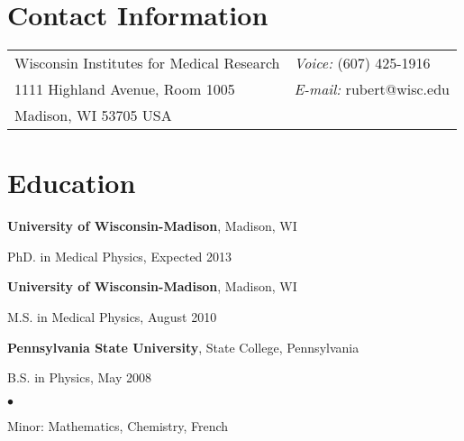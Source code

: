\documentclass[margin,line]{res}
\newenvironment{list1}{
  \begin{list}{\ding{113}}{%
      \setlength{\itemsep}{0in}
      \setlength{\parsep}{0in} \setlength{\parskip}{0in}
      \setlength{\topsep}{0in} \setlength{\partopsep}{0in}
      \setlength{\leftmargin}{0.17in}}}{\end{list}}
\newenvironment{list2}{
  \begin{list}{$\bullet$}{%
      \setlength{\itemsep}{0in}
      \setlength{\parsep}{0in} \setlength{\parskip}{0in}
      \setlength{\topsep}{0in} \setlength{\partopsep}{0in}
      \setlength{\leftmargin}{0.2in}}}{\end{list}}
\begin{document}

\begin{resume}
\section{\sc Contact Information}
\vspace{.05in}
\begin{tabular}{@{}p{3in}p{4in}}
Wisconsin Institutes for Medical Research & {\it Voice:} (607) 425-1916 \\
1111 Highland Avenue, Room 1005 & {\it E-mail:} rubert@wisc.edu \\
Madison, WI 53705 USA \\
\end{tabular}

\section{\sc Education}
{\bf University of Wisconsin-Madison}, Madison, WI \\
\vspace*{-.1in}
\begin{list1}
\item[] PhD. in Medical Physics, Expected 2013
\vspace*{.05in}
\end{list1}

{\bf University of Wisconsin-Madison}, Madison, WI \\
\vspace*{-.1in}
\begin{list1}
\item[] M.S. in Medical Physics, August 2010
\vspace*{.05in}

\end{list1}

{\bf Pennsylvania State University}, State College, Pennsylvania\\
\vspace*{-.1in}
\begin{list1}
\item[] B.S. in Physics, May 2008

\begin{list2}
 \vspace*{.05in}
 \item Minor: Mathematics, Chemistry, French
\end{list2}
\end{list1}


\end{resume}
\end{document}
